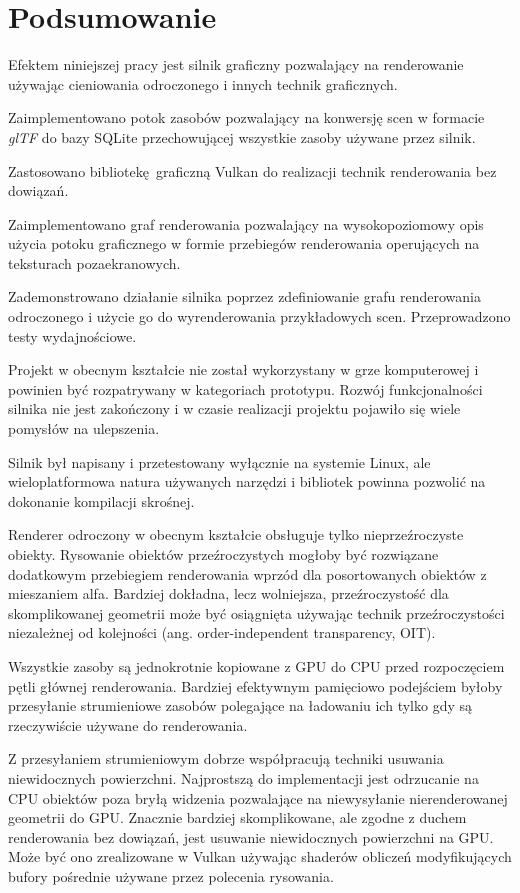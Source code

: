 \chapter{Podsumowanie}
\label{chap:summary}

Efektem niniejszej pracy jest silnik graficzny pozwalający na renderowanie używając cieniowania odroczonego i innych technik graficznych.

Zaimplementowano potok zasobów pozwalający na konwersję scen w formacie \textit{glTF} do bazy SQLite przechowującej wszystkie zasoby używane przez silnik.

Zastosowano bibliotekę graficzną Vulkan do realizacji technik renderowania bez dowiązań.

Zaimplementowano graf renderowania pozwalający na wysokopoziomowy opis użycia potoku graficznego w formie przebiegów renderowania operujących na teksturach pozaekranowych.

Zademonstrowano działanie silnika poprzez zdefiniowanie grafu renderowania odroczonego i użycie go do wyrenderowania przykładowych scen. Przeprowadzono testy wydajnościowe.


Projekt w obecnym kształcie nie został wykorzystany w grze komputerowej i powinien być rozpatrywany w kategoriach prototypu.
Rozwój funkcjonalności silnika nie jest zakończony i w czasie realizacji projektu pojawiło się wiele pomysłów na ulepszenia.

Silnik był napisany i przetestowany wyłącznie na systemie Linux, ale wieloplatformowa natura używanych narzędzi i bibliotek powinna pozwolić na dokonanie kompilacji skrośnej.

Renderer odroczony w obecnym kształcie obsługuje tylko nieprzeźroczyste obiekty. Rysowanie obiektów przeźroczystych mogłoby być rozwiązane dodatkowym przebiegiem renderowania wprzód dla posortowanych obiektów z mieszaniem alfa. Bardziej dokładna, lecz wolniejsza, przeźroczystość dla skomplikowanej geometrii może być osiągnięta używając technik przeźroczystości niezależnej od kolejności (ang. order-independent transparency, OIT).

Wszystkie zasoby są jednokrotnie kopiowane z GPU do CPU przed rozpoczęciem pętli głównej renderowania.
Bardziej efektywnym pamięciowo podejściem byłoby przesyłanie strumieniowe zasobów polegające na ładowaniu ich tylko gdy są rzeczywiście używane do renderowania.

Z przesyłaniem strumieniowym dobrze współpracują techniki usuwania niewidocznych powierzchni.
Najprostszą do implementacji jest odrzucanie na CPU obiektów poza bryłą widzenia pozwalające na niewysyłanie nierenderowanej geometrii do GPU.
Znacznie bardziej skomplikowane, ale zgodne z duchem renderowania bez dowiązań, jest usuwanie niewidocznych powierzchni na GPU. Może być ono zrealizowane w Vulkan używając shaderów obliczeń modyfikujących bufory pośrednie używane przez polecenia rysowania.

